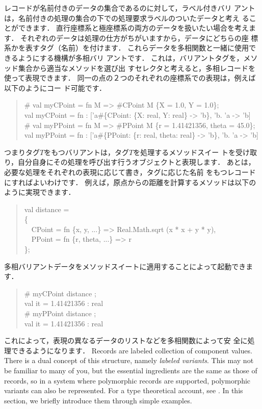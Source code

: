 \documentclass{jbook}
\newcommand{\myem}{\mbox{\ \ }}
\begin{document}
	レコードが名前付きのデータの集合であるのに対して，ラベル付きバリ
アントは，名前付きの処理の集合の下での処理要求ラベルのついたデータと考え
ることができます．
	直行座標系と極座標系の両方のデータを扱いたい場合を考えます．
	それぞれのデータは処理の仕方がちがいますから，データにどちらの座
標系かを表すタグ（名前）を付けます．
	これらデータを多相関数と一緒に使用できるようにする機構が多相バリ
アントです．
	これは，バリアントタグを，メソッド集合から適当なメソッドを選び出
すセレクタと考えると，多相レコードを使って表現できます．
	同一の点の２つのそれぞれの座標系での表現は，例えば以下のようにコー
ド可能です．		
\begin{tt}\begin{quote}
\# val myCPoint = fn M => \#CPoint M \{X = 1.0, Y = 1.0\};\\
val myCPoint = fn : ['a\#\{CPoint: \{X: real, Y: real\} -> 'b\}, 'b. 'a -> 'b]\\
\# val myPPoint = fn M => \#PPoint M \{r = 1.41421356, theta = 45.0\};\\
val myPPoint = fn : ['a\#\{PPoint: \{r: real, theta: real\} -> 'b\}, 'b. 'a -> 'b]
\end{quote}\end{tt}
	つまりタグ$T$をもつバリアントは，タグ$T$を処理するメソッドスイー
トを受け取り，自分自身にその処理を呼び出す行うオブジェクトと表現します．
	あとは，必要な処理をそれぞれの表現に応じて書き，タグに応じた名前
をもつレコードにすればよいわけです．
	例えば，原点からの距離を計算するメソッドは以下のように実現できます．
\begin{tt}\begin{quote}
val distance = \\
\{\\
\myem CPoint = fn \{x, y, ...\} => Real.Math.sqrt (x * x + y * y),\\
\myem PPoint = fn \{r, theta, ...\} => r\\
\};
\end{quote}\end{tt}
	多相バリアントデータをメソッドスイートに適用することによって起動できます．
\begin{tt}\begin{quote}
\# myCPoint distance ;\\
val it = 1.41421356 : real\\
\# myPPoint distance ;\\
val it = 1.41421356 : real
\end{quote}\end{tt}
	これによって，表現の異なるデータのリストなどを多相関数によって安
全に処理できるようになります．
\else%
	Records are labeled collection of component values.
	There is a dual concept of this structure, namely {\em labeled
variants}.
	This may not be familiar to many of you, but the essential
ingredients are the same as those of records, so in a system where
polymorphic records are supported, polymorphic variants can also be
represented.
	For a type theoretical account, see \cite{ohor95toplas}.
	In this section, we briefly introduce them through simple
examples.
\end{document}
